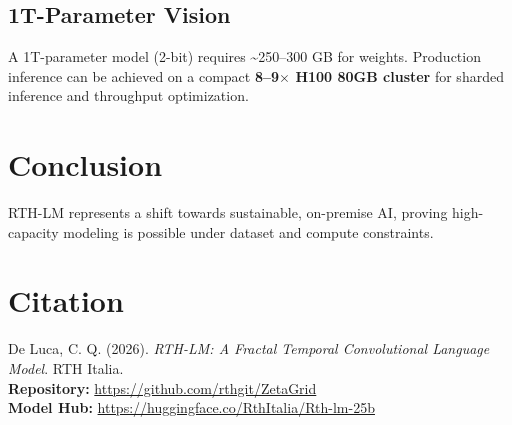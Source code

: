 \documentclass[11pt,a4paper]{article}
\begin{document}
\subsection{1T-Parameter Vision}
A 1T-parameter model (2-bit) requires \textasciitilde{}250--300 GB for weights. Production inference can be achieved on a compact \textbf{8--9$\times$ H100 80GB cluster} for sharded inference and throughput optimization.

\section{Conclusion}
RTH-LM represents a shift towards sustainable, on-premise AI, proving high-capacity modeling is possible under dataset and compute constraints.

\section*{Citation}
De Luca, C. Q. (2026). \textit{RTH-LM: A Fractal Temporal Convolutional Language Model}. RTH Italia. \\
\textbf{Repository:} \href{https://github.com/rthgit/ZetaGrid}{https://github.com/rthgit/ZetaGrid} \\
\textbf{Model Hub:} \href{https://huggingface.co/RthItalia/Rth-lm-25b}{https://huggingface.co/RthItalia/Rth-lm-25b}
\end{document}
